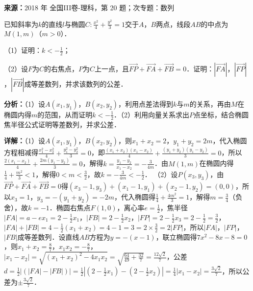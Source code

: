 \begin{question}[points=12]
\textbf{来源：}2018 年 全国III卷-理科，第 20 题；次专题：数列\par
已知斜率为$k$的直线$l$与椭圆$C:\frac{x^2}{4}+\frac{y^2}{3}=1$交于$A$，$B$两点，线段$AB$的中点为$M(1,m)$（$m>0$）．

（1）证明：$k<-\frac{1}{2}$；

（2）设$F$为$C$的右焦点，$P$为$C$上一点，且$\overrightarrow{FP}+\overrightarrow{FA}+\overrightarrow{FB}=0$．证明：$|\overrightarrow{FA}|$，$|\overrightarrow{FP}|$，$|\overrightarrow{FB}|$成等差数列，并求该数列的公差．
\begin{solution}

\textbf{分析：}（1）设$A(x_1,y_1)$，$B(x_2,y_2)$，利用点差法得到$k$与$m$的关系，再由$M$在椭圆内得$m$的范围，从而证明$k<-\frac{1}{2}$．（2）利用向量关系求出$P$点坐标，结合椭圆焦半径公式证明等差数列，并求公差．

\textbf{详解：}（1）设$A(x_1,y_1)$，$B(x_2,y_2)$，则$x_1+x_2=2$，$y_1+y_2=2m$，代入椭圆方程相减得$\frac{x_1^2-x_2^2}{4}+\frac{y_1^2-y_2^2}{3}=0$，即$\frac{(x_1+x_2)(x_1-x_2)}{4}+\frac{(y_1+y_2)(y_1-y_2)}{3}=0$，所以$\frac{2(x_1-x_2)}{4}+\frac{2m(y_1-y_2)}{3}=0$，解得$k=\frac{y_1-y_2}{x_1-x_2}=-\frac{3}{4m}$．由$M(1,m)$在椭圆内得$\frac{1}{4}+\frac{m^2}{3}<1$，解得$0<m<\frac{3}{2}$，故$k=-\frac{3}{4m}<-\frac{1}{2}$．
（2）设$P(x_3,y_3)$，由$\overrightarrow{FP}+\overrightarrow{FA}+\overrightarrow{FB}=0$得$(x_3-1,y_3)+(x_1-1,y_1)+(x_2-1,y_2)=(0,0)$，所以$x_3=1$，$y_3=-(y_1+y_2)=-2m$，代入椭圆得$\frac{1}{4}+\frac{4m^2}{3}=1$，解得$m=\frac{3}{4}$（负舍），故$k=-1$．椭圆右焦点$F(1,0)$，离心率$e=\frac{1}{2}$，焦半径$|FA|=a-ex_1=2-\frac{1}{2}x_1$，$|FB|=2-\frac{1}{2}x_2$，$|FP|=2-\frac{1}{2}x_3=2-\frac{1}{2}=\frac{3}{2}$，$|FA|+|FB|=4-\frac{1}{2}(x_1+x_2)=4-1=3=2\times\frac{3}{2}=2|FP|$，所以$|FA|$，$|FP|$，$|FB|$成等差数列．设直线$AB$方程为$y=-(x-1)$，联立椭圆得$7x^2-8x-8=0$，则$x_1+x_2=\frac{8}{7}$，$x_1x_2=-\frac{8}{7}$，$|x_1-x_2|=\sqrt{(x_1+x_2)^2-4x_1x_2}=\sqrt{\frac{64}{49}+\frac{32}{7}}=\frac{12\sqrt{2}}{7}$，公差$d=\frac{1}{2}|(|FA|-|FB|)|=\frac{1}{2}|(2-\frac{1}{2}x_1)-(2-\frac{1}{2}x_2)|=\frac{1}{4}|x_1-x_2|=\frac{3\sqrt{2}}{7}$，所以公差为$\pm\frac{3\sqrt{2}}{7}$．
\end{solution}
\end{question}

